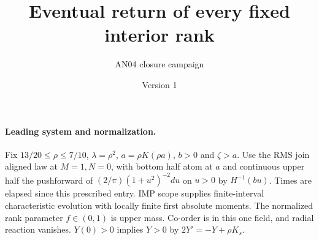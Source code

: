 \documentclass[11pt]{article}
\title{Eventual return of every fixed interior rank}
\author{AN04 closure campaign}\date{Version 1}
\begin{document}
\maketitle
\paragraph{Leading system and normalization.} Fix $13/20\le\rho\le7/10$,
$\lambda=\rho^2$, $a=\rho K(\rho a)$, $b>0$ and $\zeta>a$.
Use the RMS join aligned law at $M=1,N=0$, with bottom half atom
at $a$ and continuous upper half the pushforward of
$(2/\pi)(1+u^2)^{-2}du$ on $u>0$ by $H^{-1}(bu)$.
Times are elapsed since this prescribed entry. IMP scope supplies
finite-interval characteristic evolution with locally finite first
absolute moments. The normalized rank parameter $f\in(0,1)$
is upper mass. Co-order is in this one field, and radial reaction
vanishes. $Y(0)>0$ implies $Y>0$ by $2Y'=-Y+\rho K_s$.
\end{document}
